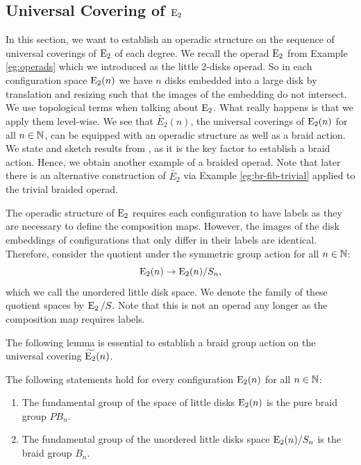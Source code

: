 \subsection{Universal Covering of $\operatorname{E}_2$}

In this section, we want to establish an operadic structure on the sequence of
universal coverings of $\operatorname{E}_2$ of each degree. We recall the operad $\operatorname{E}_2$ from
Example \ref{eg:operads} which we introduced as the little 2-disks operad. So in
each configuration space $\operatorname{E}_2(n)$ we have $n$ disks embedded into a large disk
by translation and resizing such that the images of the embedding do not intersect. We use topological
terms when talking about $\operatorname{E}_2$. What really happens is that we apply them
level-wise. We see that $\widetilde{E_2}(n)$, the universal coverings of $\operatorname{E}_2(n)$ for all $n \in \mathbb{N}$,
can be equipped with an operadic structure as well as a braid action. 
We state and sketch results from \cite{fox}, as it is the key factor to establish a braid action.
Hence, we
obtain another example of a braided operad.
Note that later there is an alternative construction of $\widetilde{E_2}$ via Example \ref{eg:br-fib-trivial}
applied to the trivial braided operad.


The operadic structure of $\operatorname{E}_2$ requires each configuration to have labels as they are necessary to define the
composition maps. However, the images of the disk embeddings of configurations that only
differ in their labels are identical. 
Therefore, consider the quotient
under the symmetric group action for all $n \in \mathbb{N}$:
\[
    \operatorname{E}_2(n) \to \operatorname{E}_2(n) \slash S_n,
\]
which we call the unordered little disk space.
We denote the family of these quotient spaces by $\operatorname{E}_2 \slash S$. Note that this is not
an operad any longer as the composition map requires labels. 


The following lemma is essential to establish a braid group action on 
the universal covering $\widetilde{\operatorname{E}_2}(n)$.

\begin{lem}\label{lem:fundamentalgroup} The following statements hold for every
    configuration $\operatorname{E}_2(n)$ for all $n \in \mathbb{N}$:
    \begin{enumerate}
        \item The fundamental group of the space of little disks $\operatorname{E}_2(n)$ is the pure braid group $PB_n$.
        \item The fundamental group of the unordered little disks space $\operatorname{E}_2(n) \slash S_n$ is the braid
        group $B_n$.
    \end{enumerate}
\end{lem}

